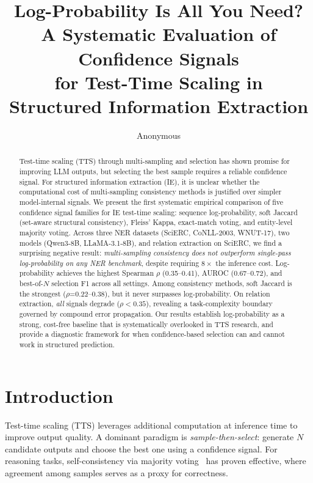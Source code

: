 \documentclass[11pt,a4paper]{article}
\title{Log-Probability Is All You Need? A Systematic Evaluation of Confidence Signals\\for Test-Time Scaling in Structured Information Extraction}
\author{Anonymous}
\begin{document}
\maketitle

\begin{abstract}
Test-time scaling (TTS) through multi-sampling and selection has shown promise for improving LLM outputs, but selecting the best sample requires a reliable confidence signal.
For structured information extraction (IE), it is unclear whether the computational cost of multi-sampling consistency methods is justified over simpler model-internal signals.
We present the first systematic empirical comparison of five confidence signal families for IE test-time scaling: sequence log-probability, soft Jaccard (set-aware structural consistency), Fleiss' Kappa, exact-match voting, and entity-level majority voting.
Across three NER datasets (SciERC, CoNLL-2003, WNUT-17), two models (Qwen3-8B, LLaMA-3.1-8B), and relation extraction on SciERC, we find a surprising negative result: \emph{multi-sampling consistency does not outperform single-pass log-probability on any NER benchmark}, despite requiring $8\times$ the inference cost.
Log-probability achieves the highest Spearman $\rho$ (0.35--0.41), AUROC (0.67--0.72), and best-of-$N$ selection F1 across all settings.
Among consistency methods, soft Jaccard is the strongest ($\rho$=0.22--0.38), but it never surpasses log-probability.
On relation extraction, \emph{all} signals degrade ($\rho<0.35$), revealing a task-complexity boundary governed by compound error propagation.
Our results establish log-probability as a strong, cost-free baseline that is systematically overlooked in TTS research, and provide a diagnostic framework for when confidence-based selection can and cannot work in structured prediction.
\end{abstract}

\section{Introduction}

Test-time scaling (TTS) leverages additional computation at inference time to improve output quality. A dominant paradigm is \emph{sample-then-select}: generate $N$ candidate outputs and choose the best one using a confidence signal. For reasoning tasks, self-consistency via majority voting~\cite{wang2023selfconsistency} has proven effective, where agreement among samples serves as a proxy for correctness.
\end{document}
